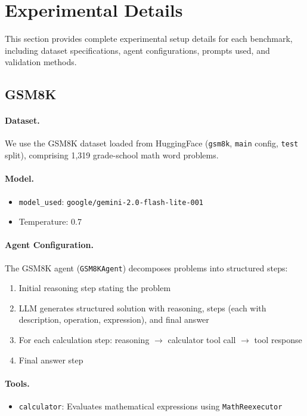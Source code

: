 \documentclass{article}
\theoremstyle{plain}
\theoremstyle{definition}
\theoremstyle{remark}
\begin{document}
\section{Experimental Details}
\label{app:experimental_details}

This section provides complete experimental setup details for each benchmark, including dataset specifications, agent configurations, prompts used, and validation methods.

\subsection{GSM8K}
\label{app:gsm8k}

\paragraph{Dataset.}
We use the GSM8K dataset \cite{cobbe2021gsm8k} loaded from HuggingFace (\texttt{gsm8k}, \texttt{main} config, \texttt{test} split), comprising 1,319 grade-school math word problems.

\paragraph{Model.}
\begin{itemize}
    \item \texttt{model\_used}: \texttt{google/gemini-2.0-flash-lite-001}
    \item Temperature: 0.7
\end{itemize}

\paragraph{Agent Configuration.}
The GSM8K agent (\texttt{GSM8KAgent}) decomposes problems into structured steps:
\begin{enumerate}
    \item Initial reasoning step stating the problem
    \item LLM generates structured solution with reasoning, steps (each with description, operation, expression), and final answer
    \item For each calculation step: reasoning $\rightarrow$ calculator tool call $\rightarrow$ tool response
    \item Final answer step
\end{enumerate}

\paragraph{Tools.}
\begin{itemize}
    \item \texttt{calculator}: Evaluates mathematical expressions using \texttt{MathReexecutor}
\end{itemize}
\end{document}
